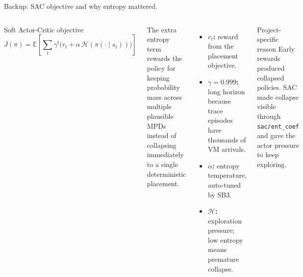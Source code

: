 \documentclass[11pt,aspectratio=43]{beamer}
\begin{document}
\begin{frame}[shrink=5]{Backup: SAC objective and why entropy mattered.}

  \begin{columns}[T,onlytextwidth]

      \vspace{0.2em}
      \begin{block}{Soft Actor-Critic objective}
        \scriptsize
        \[
          J(\pi)
          =
          \mathbb{E}
          \left[
            \sum_t \gamma^t
            \bigl(r_t + \alpha\,\mathcal{H}(\pi(\cdot \mid s_t))\bigr)
          \right]
        \]
      \end{block}

      \vspace{0.4em}
      \small
      The extra entropy term rewards the policy for keeping probability mass
      across multiple plausible MPDs instead of collapsing immediately to a
      single deterministic placement.

      \vspace{0.2em}
      \begin{itemize}
        \setlength{\itemsep}{0.65em}
        \item \textbf{$r_t$:} reward from the placement objective.
        \item \textbf{$\gamma = 0.999$:} long horizon because trace episodes
              have thousands of VM arrivals.
        \item \textbf{$\alpha$:} entropy temperature, auto-tuned by SB3.
        \item \textbf{$\mathcal{H}$:} exploration pressure; low entropy means
              premature collapse.
      \end{itemize}

      \vspace{0.35em}
      \begin{block}{Project-specific reason}
        \small
        Early rewards produced collapsed policies.  SAC made collapse visible
        through \texttt{sac/ent\_coef} and gave the actor pressure to keep exploring.
      \end{block}

  \end{columns}

\end{frame}
\end{document}
